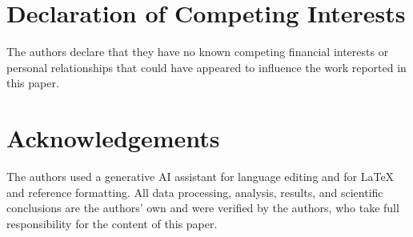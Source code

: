 \documentclass[12pt]{article}
\begin{document}
\section*{Declaration of Competing Interests}

The authors declare that they have no known competing financial
interests or personal relationships that could have appeared to
influence the work reported in this paper.

\section*{Acknowledgements}

The authors used a generative AI assistant for language editing and
for \LaTeX{} and reference formatting. All data processing, analysis,
results, and scientific conclusions are the authors' own and were
verified by the authors, who take full responsibility for the content
of this paper.




\end{document}
